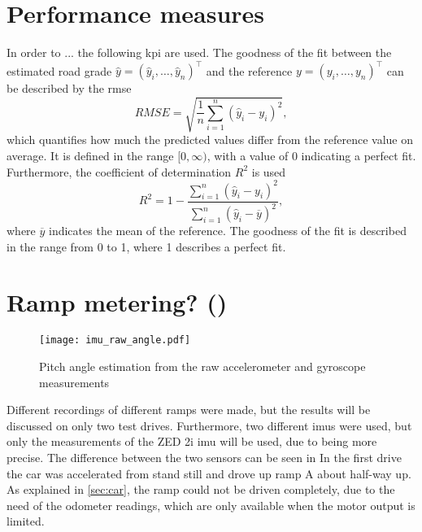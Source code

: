 \section{Performance measures}
In order to ...
the following \gls{kpi} are used.
The goodness of the fit between the estimated road grade $\hat{y} = (\hat{y}_i, \dots, \hat{y}_n)^\intercal$ and the reference $y = (y_i, \dots, y_n)^\intercal$ can be described by the \gls{rmse}
\begin{equation}
	RMSE = \sqrt{\frac{1}{n}\sum_{i = 1}^n(\hat{y}_i - y_i)^2},
\end{equation}
which quantifies how much the predicted values differ from the reference value on average.
It is defined in the range $[0, \infty)$, with a value of 0 indicating a perfect fit.
Furthermore, the coefficient of determination $R^2$ is used
\begin{equation}
	R^2 = 1 - \frac{\sum\limits_{i = 1}^n(\hat{y}_i - y_i)^2}{\sum\limits_{i = 1}^n(\hat{y}_i - \overline{y})^2},
\end{equation}
where $\overline{y}$ indicates the mean of the reference.
The goodness of the fit is described in the range from 0 to 1, where 1 describes a perfect fit.\\



\section{Ramp metering? ()}
\begin{figure}[htbp]
	\centering
	\texttt{[image: imu\_raw\_angle.pdf]}
	\caption[Raw]{Pitch angle estimation from the raw accelerometer and gyroscope measurements}
	\label{fig:imu_raw_angle}
\end{figure}
Different recordings of different ramps were made, but the results will be discussed on only two test drives.
Furthermore, two different \gls{imu}s were used, but only the measurements of the ZED 2i \gls{imu} will be used, due to being more precise.
The difference between the two sensors can be seen in
In the first drive the car was accelerated from stand still and drove up ramp A about half-way up.
As explained in \cref{sec:car}, the ramp could not be driven completely, due to the need of the odometer readings, which are only available when the motor output is limited.
